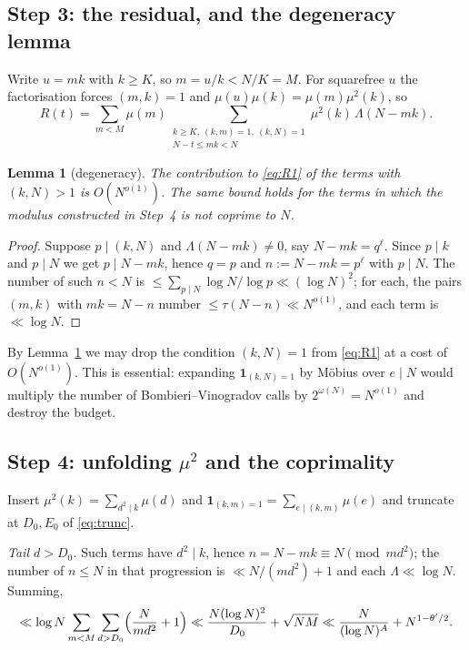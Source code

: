 \documentclass[11pt,a4paper]{article}
\theoremstyle{plain}
\newtheorem{lemma}[theorem]{Lemma}
\theoremstyle{definition}
\begin{document}
\subsection{Step 3: the residual, and the degeneracy lemma}

Write $u=mk$ with $k\ge K$, so $m=u/k<N/K=M$. For squarefree $u$ the
factorisation forces $(m,k)=1$ and $\mu(u)\mu(k)=\mu(m)\mu^2(k)$, so
\begin{equation}\label{eq:R1}
  R(t)=\sum_{m<M}\mu(m)
      \sum_{\substack{k\ge K,\ (k,m)=1,\ (k,N)=1\\ N-t\le mk<N}}
      \mu^2(k)\,\Lambda(N-mk).
\end{equation}

\begin{lemma}[degeneracy]\label{lem:degen}
The contribution to \eqref{eq:R1} of the terms with $(k,N)>1$ is
$O(N^{o(1)})$. The same bound holds for the terms in which the modulus
constructed in Step~4 is not coprime to $N$.
\end{lemma}

\begin{proof}
Suppose $p\mid(k,N)$ and $\Lambda(N-mk)\ne0$, say $N-mk=q^\ell$. Since
$p\mid k$ and $p\mid N$ we get $p\mid N-mk$, hence $q=p$ and
$n:=N-mk=p^\ell$ with $p\mid N$. The number of such $n<N$ is
$\le\sum_{p\mid N}\log N/\log p\ll(\log N)^2$; for each, the pairs
$(m,k)$ with $mk=N-n$ number $\le\tau(N-n)\ll N^{o(1)}$, and each term is
$\ll\log N$.
\end{proof}

By Lemma~\ref{lem:degen} we may drop the condition $(k,N)=1$ from
\eqref{eq:R1} at a cost of $O(N^{o(1)})$. This is essential: expanding
$\mathbf 1_{(k,N)=1}$ by M\"obius over $e\mid N$ would multiply the number
of Bombieri--Vinogradov calls by $2^{\omega(N)}=N^{o(1)}$ and destroy the
budget.

\subsection{Step 4: unfolding $\mu^2$ and the coprimality}

Insert $\mu^2(k)=\sum_{d^2\mid k}\mu(d)$ and
$\mathbf 1_{(k,m)=1}=\sum_{e\mid(k,m)}\mu(e)$ and truncate at $D_0,E_0$
of \eqref{eq:trunc}.

\emph{Tail $d>D_0$.} Such terms have $d^2\mid k$, hence
$n=N-mk\equiv N\pmod{md^2}$; the number of $n\le N$ in that progression
is $\ll N/(md^2)+1$ and each $\Lambda\ll\log N$. Summing,
\[
  \ll \log N\sum_{m<M}\sum_{d>D_0}\Bigl(\frac{N}{md^2}+1\Bigr)
  \ll \frac{N(\log N)^2}{D_0} + \sqrt{NM}
  \ll \frac{N}{(\log N)^{A}} + N^{1-\theta'/2}.
\]
\end{document}
